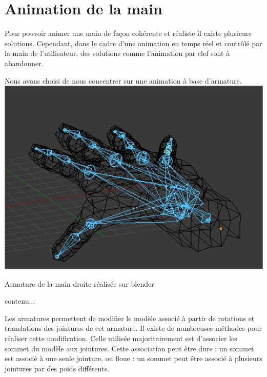 

\section{Animation de la main}
	
Pour pouvoir animer une main de façon cohérente et réaliste il existe plusieurs solutions. 
Cependant, dans le cadre d'une animation en temps réel et contrôlé par la main de l'utilisateur, des solutions comme l'animation par clef sont à abandonner.

Nous avons choisi de nous concentrer sur une animation à base d'armature.
 \center
 \includegraphics[width=14cm]{images/SkellHand.jpg}
 \caption{Armature de la main droite réalisée sur blender}	contenu...


Les armatures permettent de modifier le modèle associé à partir de rotations et translations des jointures de cet armature.
Il existe de nombreuses méthodes pour réaliser cette modification.
Celle utilisée majoritairement est d'associer les sommet du modèle aux jointures. Cette association peut être dure : un sommet est associé à une seule jointure, ou floue : un sommet peut être associé à plusieurs jointures par des poids différents.

